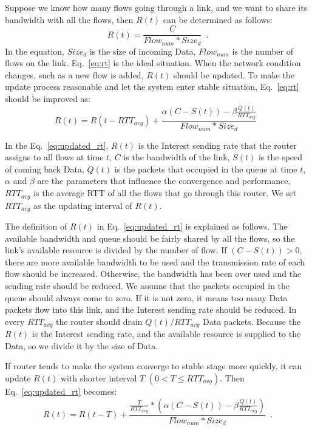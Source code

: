 Suppose we know how many flows going through a link, and we want to share its bandwidth with all the flows, then $R(t)$ can be determined as follows:
\begin{equation}
	\label{eq:rt}
	R(t)=\frac{C}{Flow_{num}*Size_{d}} \enspace .
\end{equation}
In the equation, $Size_{d}$ is the size of incoming Data, $Flow_{num}$ is the number of flows on the link. Eq.~\ref{eq:rt} is the ideal situation. When the network condition changes, such as a new flow is added, $R(t)$ should be updated. To make the update process reasonable and let the system enter stable situation, Eq.~\ref{eq:rt} should be improved as:
\begin{equation}
	\label{eq:updated_rt}
	R(t)=R(t-RTT_{avg})+\frac{\alpha(C-S(t))-\beta\frac{Q(t)}{RTT_{avg}}}{Flow_{num}*Size_{d}} \enspace 
\end{equation}

In the Eq.~\ref{eq:updated_rt}, $R(t)$ is the Interest sending rate that the router assigns to all flows at time $t$, $C$ is the bandwidth of the link, $S(t)$ is the speed of coming back Data, $Q(t)$ is the packets that occupied in the queue at time $t$, $\alpha$ and $\beta$ are the parameters that influence the convergence and performance, $RTT_{avg}$ is the average RTT of all the flows that go through this router. We set $RTT_{avg}$ as the updating interval of $R(t)$.

The definition of $R(t)$ in Eq.~\ref{eq:updated_rt} is explained as follows. The available bandwidth and queue should be fairly shared by all the flows, so the link's available resource is divided by the number of flow. If $(C-S(t))>0$, there are more available bandwidth to be used and the transmission rate of each flow should be increased. Otherwise, the bandwidth has been over used and the sending rate should be reduced. We assume that the packets occupied in the queue should always come to zero. If it is not zero, it means too many Data packets flow into this link, and the Interest sending rate should be reduced. In every $RTT_{avg}$ the router should drain $Q(t)/RTT_{avg}$ Data packets. Because the $R(t)$ is the Interest sending rate, and the available resource is supplied to the Data, so we divide it by the size of Data.

If router tends to make the system converge to stable stage more quickly, it can update $R(t)$ with shorter interval $T$ $(0 < T \leq RTT_{avg})$. Then Eq.~\ref{eq:updated_rt} becomes:
\begin{equation}
	\label{eq:updated_rt3}
	R(t)=R(t-T)+\frac{\frac{T}{RTT_{avg}}\ast(\alpha(C-S(t))-\beta\frac{Q(t)}{RTT_{avg}})}{Flow_{num}*Size_{d}} \enspace .
\end{equation}

